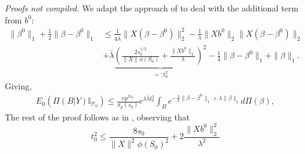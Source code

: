 \documentclass[11pt]{article}
\renewenvironment{proof}[1]{\par\noindent{\bf #1 \ }}{\hfill\BlackBox\\[2mm]}
\renewenvironment{proof}[1]{\textit{Proofs not compiled.}}{}
\newcommand{\T}{\mathcal{T}}
\newcommand{\bezero}{\beta^0}
\begin{document}
\begin{proof}{Proof of Theorem \ref{thm:dimension_no_deconfounding}}
We adapt the approach of \cite{CS-HV2015} to deal with the additional term from $b^0$:
\begin{align*}
\|\beta^0\|_1 + \frac{1}{2}\|\beta - \bezero\|_1 
&\leq\frac{1}{4 \bar{\lambda}}\|X(\beta - \bezero)\|_2^2 - \frac{1}{\lambda}\|Xb^0\|_2\|X(\beta - \bezero)\|_2\\ &+  \bar{\lambda	} \underbrace{ \left(\frac{2s_0^{1/2}}{\|X\|\phi(S_0)}+ \frac{\|Xb^0\|_2}{\lambda} \right)^2}_{=: t_0^2} - \frac{1}{4}\|\beta - \bezero\|_1 + \|\beta\|_1.
\end{align*}
Giving,
\begin{align}
	E_0 \left(\Pi(B | Y) \mathbb{I}_{\T_0} \right) \leq \frac{ep^{2s_0}}{\pi_p(s_0)} e^{\lambda\bar{\lambda}t_0^2}\int_B 
	e^{-\frac{\lambda}{4}\|\beta - \beta^0\|_1 + \lambda\|\beta\|_1} d\Pi(\beta),
\end{align}
The rest of the proof follows as in \cite{CS-HV2015}, observing that 
$$t_0^2 \leq \frac{8s_0}{\|X\|^2\phi(S_0)^2} +  2\frac{\|Xb^0\|_2^2}{\lambda^2} 
$$	
\end{proof}
\end{document}
